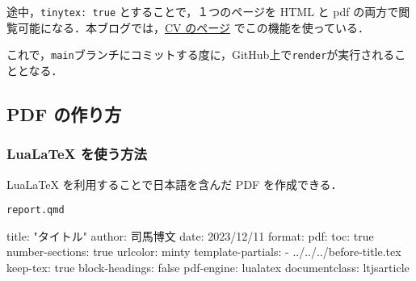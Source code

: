 \documentclass[
]{ltjsarticle}
\newenvironment{Shaded}{\begin{snugshade}}{\end{snugshade}}
\newcommand{\AttributeTok}[1]{\textcolor[rgb]{0.40,0.45,0.13}{#1}}
\newcommand{\CommentTok}[1]{\textcolor[rgb]{0.37,0.37,0.37}{#1}}
\newcommand{\FunctionTok}[1]{\textcolor[rgb]{0.28,0.35,0.67}{#1}}
\newcommand{\KeywordTok}[1]{\textcolor[rgb]{0.00,0.23,0.31}{#1}}
\newcommand{\NormalTok}[1]{\textcolor[rgb]{0.00,0.23,0.31}{#1}}
\begin{document}
\begin{codelisting}
\begin{Shaded}
\end{Shaded}

\end{codelisting}

途中，\texttt{tinytex:\ true} とすることで，１つのページを HTML と pdf
の両方で閲覧可能になる．本ブログでは，\href{https://162348.github.io/static/CV/cv.html}{CV
のページ} でこの機能を使っている．

これで，\texttt{main}ブランチにコミットする度に，GitHub上で\texttt{render}が実行されることとなる．

\subsection{PDF の作り方}\label{pdf-ux306eux4f5cux308aux65b9}

\subsubsection{LuaLaTeX
を使う方法}\label{lualatex-ux3092ux4f7fux3046ux65b9ux6cd5}

LuaLaTeX を利用することで日本語を含んだ PDF を作成できる．

\begin{codelisting}

\caption{\texttt{report.qmd}}

\begin{Shaded}
\begin{Highlighting}[]
\NormalTok{title: "タイトル"}
\NormalTok{author: 司馬博文}
\NormalTok{date: 2023/12/11}
\NormalTok{format:}
\NormalTok{  pdf:}
\NormalTok{    toc: true}
\NormalTok{    number{-}sections: true}
\NormalTok{    urlcolor: minty}
\NormalTok{    template{-}partials: }
\NormalTok{      {-} ../../../before{-}title.tex}
\NormalTok{    keep{-}tex: true}
\NormalTok{    block{-}headings: false}
\NormalTok{    pdf{-}engine: lualatex}
\NormalTok{    documentclass: ltjsarticle}
\end{Highlighting}
\end{Shaded}

\end{codelisting}
\end{document}

